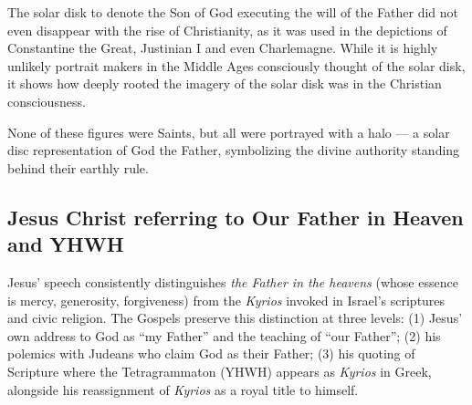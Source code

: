 The solar disk to denote the Son of God executing the will of the Father did not even disappear with the rise of Christianity, as it was used in the depictions of Constantine the Great, Justinian I and even Charlemagne.
While it is highly unlikely portrait makers in the Middle Ages consciously thought of the solar disk, it shows how deeply rooted the imagery of the solar disk was in the Christian consciousness.

None of these figures were Saints, but all were portrayed with a halo --- a solar disc representation of God the Father, symbolizing the divine authority standing behind their earthly rule.

\subsection{Jesus Christ referring to Our Father in Heaven and YHWH}\label{subsec:jesus-christ-referring-to-our-father-in-heaven-and-yhwh}
Jesus’ speech consistently distinguishes \emph{the Father in the heavens} (whose essence is mercy, generosity, forgiveness) from the \emph{Kyrios} invoked in Israel’s scriptures and civic religion. The Gospels preserve this distinction at three levels: (1) Jesus’ own address to God as “my Father” and the teaching of “our Father”; (2) his polemics with Judeans who claim God as their Father; (3) his quoting of Scripture where the Tetragrammaton (YHWH) appears as \emph{Kyrios} in Greek, alongside his reassignment of \emph{Kyrios} as a royal title to himself.

